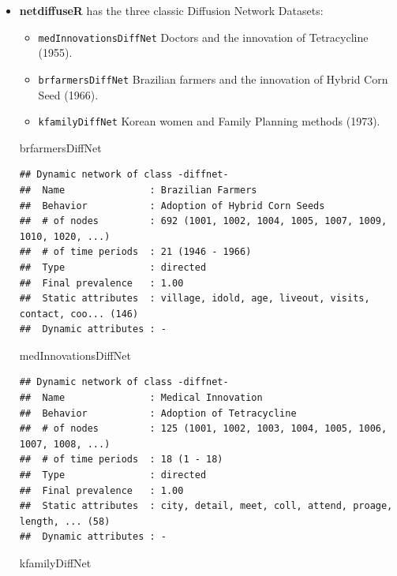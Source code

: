 \documentclass[
]{book}
\newenvironment{Shaded}{\begin{snugshade}}{\end{snugshade}}
\newcommand{\NormalTok}[1]{#1}
\providecommand{\tightlist}{%
  \setlength{\itemsep}{0pt}\setlength{\parskip}{0pt}}
\begin{document}
\begin{itemize}
\item
  \textbf{netdiffuseR} has the three classic Diffusion Network Datasets:

  \begin{itemize}
  \tightlist
  \item
    \texttt{medInnovationsDiffNet} Doctors and the innovation of Tetracycline (1955).
  \item
    \texttt{brfarmersDiffNet} Brazilian farmers and the innovation of Hybrid Corn Seed (1966).
  \item
    \texttt{kfamilyDiffNet} Korean women and Family Planning methods (1973).
  \end{itemize}

\begin{Shaded}
\begin{Highlighting}[]
\NormalTok{brfarmersDiffNet}
\end{Highlighting}
\end{Shaded}

\begin{verbatim}
## Dynamic network of class -diffnet-
##  Name               : Brazilian Farmers
##  Behavior           : Adoption of Hybrid Corn Seeds
##  # of nodes         : 692 (1001, 1002, 1004, 1005, 1007, 1009, 1010, 1020, ...)
##  # of time periods  : 21 (1946 - 1966)
##  Type               : directed
##  Final prevalence   : 1.00
##  Static attributes  : village, idold, age, liveout, visits, contact, coo... (146)
##  Dynamic attributes : -
\end{verbatim}

\begin{Shaded}
\begin{Highlighting}[]
\NormalTok{medInnovationsDiffNet}
\end{Highlighting}
\end{Shaded}

\begin{verbatim}
## Dynamic network of class -diffnet-
##  Name               : Medical Innovation
##  Behavior           : Adoption of Tetracycline
##  # of nodes         : 125 (1001, 1002, 1003, 1004, 1005, 1006, 1007, 1008, ...)
##  # of time periods  : 18 (1 - 18)
##  Type               : directed
##  Final prevalence   : 1.00
##  Static attributes  : city, detail, meet, coll, attend, proage, length, ... (58)
##  Dynamic attributes : -
\end{verbatim}

\begin{Shaded}
\begin{Highlighting}[]
\NormalTok{kfamilyDiffNet}
\end{Highlighting}
\end{Shaded}


\end{itemize}
\end{document}
